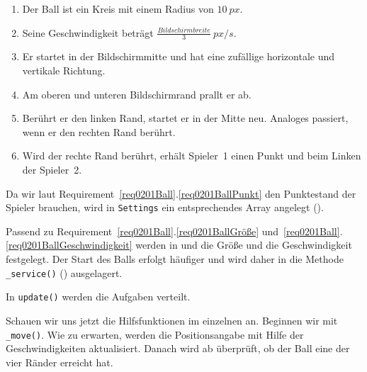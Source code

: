 \begin{enumerate}
	\item Der Ball ist ein Kreis mit einem Radius von $10~px$.\label{req0201BallGröße}
	\item Seine Geschwindigkeit beträgt $\frac{Bildschirmbreite}{3}~px/s$.\label{req0201BallGeschwindigkeit}
	\item Er startet in der Bildschirmmitte und hat eine zufällige horizontale und vertikale Richtung.\label{req0201BallStart}
	\item Am oberen und unteren Bildschirmrand prallt er ab.\label{req0201BallObenUnten}
	\item Berührt er den linken Rand, startet er in der Mitte neu. Analoges passiert, wenn er den rechten Rand berührt.\label{req0201BallRechtsLinks}
	\item Wird der rechte Rand berührt, erhält Spieler~1 einen Punkt und beim Linken der Spieler~2.\label{req0201BallPunkt} 
\end{enumerate}
\er

Da wir laut Requirement~\ref{req0201Ball}.\ref{req0201BallPunkt} den Punktestand der Spieler brauchen, wird in \texttt{Settings} ein entsprechendes Array angelegt ().



Passend zu Requirement~\ref{req0201Ball}.\ref{req0201BallGröße} und~\ref{req0201Ball}.\ref{req0201BallGeschwindigkeit} werden in  und  die Größe und die Geschwindigkeit festgelegt. Der Start des Balls erfolgt häufiger und wird daher in die Methode \texttt{\_service()} () ausgelagert.


In \texttt{update()} werden die Aufgaben verteilt.


Schauen wir uns jetzt die Hilfsfunktionen im einzelnen an. Beginnen wir mit \texttt{\_move()}. Wie zu erwarten, werden die Positionsangabe mit Hilfe der Geschwindigkeiten aktualisiert. Danach wird ab  überprüft, ob der Ball eine der vier Ränder erreicht hat.

